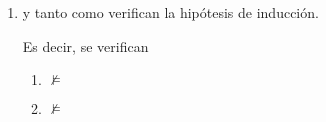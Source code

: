 \begin{isabellebody}
\begin{isamarkuptext}
\begin{demostracion}
\begin{enumerate}
Por otra parte, 
$$\begin{array}{lrl}
 & \isa{{\isasymnot}\ F\ {\isasymin}\ S} & \\
\isa{{\isasymLongrightarrow}} & \isa{{\isasymnot}\ {\isacharparenleft}G\ {\isasymor}\ H{\isacharparenright}\ {\isasymin}\ S} & \\
\isa{{\isasymLongrightarrow}} & \isa{{\isasymnot}\ G\ {\isasymin}\ S\ {\isasymand}\ {\isasymnot}\ H\ {\isasymin}\ S} & \isa{{\isacharparenleft}S\ es\ conjunto\ de\ Hintikka{\isacharparenright}}\\
\isa{{\isasymLongrightarrow}} & \isa{{\isasymI}\isactrlsub S} \not\models \isa{G\ {\isasymand}\ {\isasymI}\isactrlsub S} \not\models \isa{H} & \isa{{\isacharparenleft}HI{\isadigit{1}}\ y\ HI{\isadigit{2}}{\isacharparenright}}\\
\isa{{\isasymLongrightarrow}} & \isa{{\isasymnot}\ {\isacharparenleft}{\isasymI}\isactrlsub S\ {\isasymTurnstile}\ G\ {\isasymor}\ {\isasymI}\isactrlsub S\ {\isasymTurnstile}\ H{\isacharparenright}} & \\
\isa{{\isasymLongrightarrow}} & \isa{{\isasymI}\isactrlsub S{\isacharparenleft}G{\isacharparenright}\ {\isasymor}\ {\isasymI}\isactrlsub S{\isacharparenleft}H{\isacharparenright}} \isa{{\isacharequal}\ False} & \\
\isa{{\isasymLongrightarrow}} & \isa{{\isasymI}\isactrlsub S{\isacharparenleft}G\ {\isasymor}\ H{\isacharparenright}} \isa{{\isacharequal}\ False} & \\
\isa{{\isasymLongrightarrow}} & \isa{{\isasymI}\isactrlsub S{\isacharparenleft}F{\isacharparenright}}  \isa{{\isacharequal}\ False}& \\ 
\isa{{\isasymLongrightarrow}} & \isa{{\isasymI}\isactrlsub S} \not\models \isa{F} & 
      \end{array}$$ 

  \item[Caso 6:]  y tanto  como  verifican la 
  hipótesis de inducción. 

  Es decir, se verifican 
   \begin{enumerate}
     \item [HI1:]    
        $\not\models$ 
     \item [HI2:]    
        $\not\models$ 
   \end{enumerate}
 

\end{enumerate}
\end{demostracion}
\end{isamarkuptext}
\end{isabellebody}
